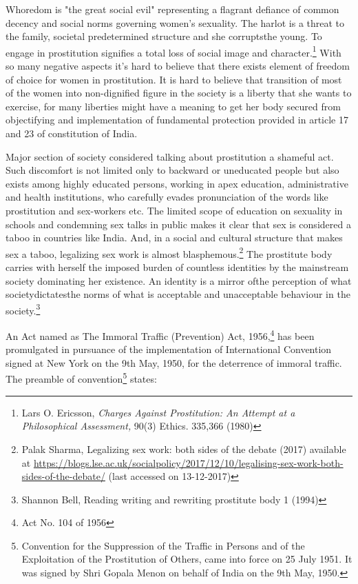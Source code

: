 \begin{multicols}{2}
\noi
Whoredom is "the great social evil" representing a flagrant defiance of common decency and
social norms governing women’s sexuality. The harlot is a threat to the family, societal predetermined structure and she corruptsthe young. To engage in prostitution signifies a total loss
of social image and character.\footnote{Lars O. Ericsson, \textit{Charges Against Prostitution: An Attempt at a Philosophical Assessment,} 90(3) Ethics. 335,366 (1980)} With so many negative aspects it’s hard to believe that there exists element of freedom of choice for women in prostitution. It is hard to believe that transition of most of the women into non-dignified figure in the society is a liberty that she
wants to exercise, for many liberties might have a meaning to get her body secured from
objectifying and implementation of fundamental protection provided in article 17 and 23 of
constitution of India.

\vspace{-.2cm}


\vspace{-.1cm}

\noi
Major section of society considered talking about prostitution a shameful act. Such discomfort
is not limited only to backward or uneducated people but also exists among highly educated
persons, working in apex education, administrative and health institutions, who carefully
evades pronunciation of the words like prostitution and sex-workers etc. The limited scope of
education on sexuality in schools and condemning sex talks in public makes it clear that sex is
considered a taboo in countries like India. And, in a social and cultural structure that makes sex
a taboo, legalizing sex work is almost blasphemous.\footnote{Palak Sharma, Legalizing sex work: both sides of the debate (2017) available at \url{https://blogs.lse.ac.uk/socialpolicy/2017/12/10/legalising-sex-work-both-sides-of-the-debate/} (last accessed on 13-12-2017)} The prostitute body carries with herself
the imposed burden of countless identities by the mainstream society dominating her existence.
An identity is a mirror ofthe perception of what societydictatesthe norms of what is acceptable
and unacceptable behaviour in the society.\footnote{Shannon Bell, Reading writing and rewriting prostitute body 1 (1994)}

\vspace{-.1cm}

\noi
An Act named as The Immoral Traffic (Prevention) Act, 1956,\footnote{Act No. 104 of 1956} has been promulgated in
pursuance of the implementation of International Convention signed at New York on the 9th
May, 1950, for the deterrence of immoral traffic. The preamble of convention\footnote{Convention for the Suppression of the Traffic in Persons and of the Exploitation of the Prostitution of Others,
came into force on 25 July 1951. It was signed by Shri Gopala Menon on behalf of India on the 9th May, 1950.} states:


\end{multicols}
